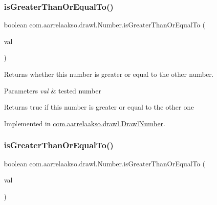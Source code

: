 \subsubsection{\texorpdfstring{is\+Greater\+Than\+Or\+Equal\+To()}{isGreaterThanOrEqualTo()}\hspace{0.1cm}{\footnotesize\ttfamily [1/2]}}
{\footnotesize\ttfamily boolean com.\+aarrelaakso.\+drawl.\+Number.\+is\+Greater\+Than\+Or\+Equal\+To (\begin{DoxyParamCaption}\item[{@Not\+Null final \hyperlink{interfacecom_1_1aarrelaakso_1_1drawl_1_1_number}{Number}}]{val }\end{DoxyParamCaption})}



Returns whether this number is greater or equal to the other number. 


\begin{DoxyParams}{Parameters}
{\em val} & tested number \\
\hline
\end{DoxyParams}
\begin{DoxyReturn}{Returns}
true if this number is greater or equal to the other one 
\end{DoxyReturn}


Implemented in \hyperlink{classcom_1_1aarrelaakso_1_1drawl_1_1_drawl_number_a4818a61a5d26f43b0d5e11cb9f22551f}{com.\+aarrelaakso.\+drawl.\+Drawl\+Number}.

\mbox{\label{interfacecom_1_1aarrelaakso_1_1drawl_1_1_number_ae41d4d8a98ecc4a8e9e3be80d1a6b291}} 
\subsubsection{\texorpdfstring{is\+Greater\+Than\+Or\+Equal\+To()}{isGreaterThanOrEqualTo()}\hspace{0.1cm}{\footnotesize\ttfamily [2/2]}}
{\footnotesize\ttfamily boolean com.\+aarrelaakso.\+drawl.\+Number.\+is\+Greater\+Than\+Or\+Equal\+To (\begin{DoxyParamCaption}\item[{final double}]{val }\end{DoxyParamCaption})}



